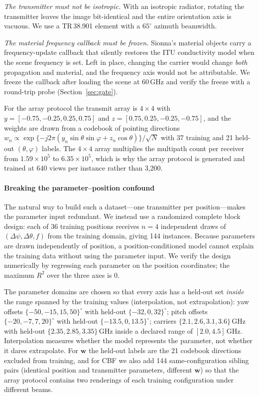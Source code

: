 \documentclass[conference]{IEEEtran}
\begin{document}
\emph{The transmitter must not be isotropic.} With an isotropic radiator,
rotating the transmitter leaves the image bit-identical and the entire
orientation axis is vacuous. We use a TR\,38.901 element \cite{tr38901} with a
$65^\circ$ azimuth beamwidth.

\emph{The material frequency callback must be frozen.} Sionna's material
objects carry a frequency-update callback that silently restores the ITU
conductivity model when the scene frequency is set. Left in place, changing the
carrier would change \emph{both} propagation and material, and the frequency
axis would not be attributable. We freeze the callback after loading the scene
at 60\,GHz and verify the freeze with a round-trip probe (Section~\ref{sec:gate}).

For the array protocol the transmit array is $4\times4$ with
$y=[-0.75,-0.25,0.25,0.75]$ and $z=[0.75,0.25,-0.25,-0.75]$, and the weights are
drawn from a codebook of pointing directions
$w_n\!\propto\!\exp\{-j2\pi(y_n\sin\theta\sin\varphi+z_n\cos\theta)\}/\sqrt{N}$
with 37 training and 21 held-out $(\theta,\varphi)$ labels. The $4\times4$ array
multiplies the multipath count per receiver from $1.59\times10^{5}$ to
$6.35\times10^{5}$, which is why the array protocol is generated and trained at
640 views per instance rather than 3{,}200.

\paragraph{Breaking the parameter--position confound}
The natural way to build such a dataset---one transmitter per position---makes
the parameter input redundant. We instead use a randomized complete block
design: each of 36 training positions receives $n=4$ independent draws of
$(\Delta\psi,\Delta\theta,f)$ from the training domain, giving 144 instances.
Because parameters are drawn independently of position, a position-conditioned
model cannot explain the training data without using the parameter input. We
verify the design numerically by regressing each parameter on the position
coordinates; the maximum $R^2$ over the three axes is $0$.

The parameter domains are chosen so that every axis has a held-out set
\emph{inside} the range spanned by the training values (interpolation, not
extrapolation): yaw offsets $\{-50,-15,15,50\}^\circ$ with held-out
$\{-32,0,32\}^\circ$; pitch offsets $\{-20,-7,7,20\}^\circ$ with held-out
$\{-13.5,0,13.5\}^\circ$; carriers $\{2.1,2.6,3.1,3.6\}$\,GHz with held-out
$\{2.35,2.85,3.35\}$\,GHz inside a declared range of $[2.0,4.5]$\,GHz.
Interpolation measures whether the model represents the parameter, not whether
it dares extrapolate. For $\mathbf{w}$ the held-out labels are the 21 codebook
directions excluded from training, and for CBF we also add 144
same-configuration sibling pairs (identical position and transmitter
parameters, different $\mathbf{w}$) so that the array protocol contains two
renderings of each training configuration under different beams.
\end{document}
